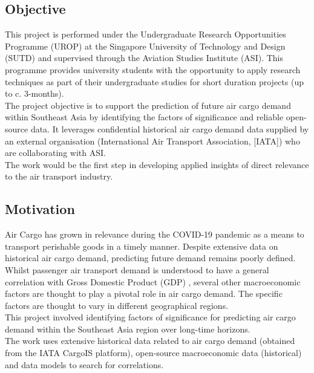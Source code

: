 \documentclass{article}
\begin{document}
\subsection{Objective}

This project is performed under the Undergraduate Research Opportunities Programme (UROP) at the Singapore University of Technology and Design (SUTD) and supervised through the Aviation Studies Institute (ASI). This programme provides university students with the opportunity to apply research techniques as part of their undergraduate studies for short duration projects (up to c. 3-months). \\

\noindent The project objective is to support the prediction of future air cargo demand within Southeast Asia by identifying the factors of significance and reliable open-source data. It leverages confidential historical air cargo demand data supplied by an external organisation (International Air Transport Association, [IATA]) who are collaborating with ASI. \\

\noindent The work would be the first step in developing applied insights of direct relevance to the air transport industry. \\

\subsection{Motivation}

Air Cargo has grown in relevance during the COVID-19 pandemic as a means to transport perishable goods in a timely manner. Despite extensive data on historical air cargo demand, predicting future demand remains poorly defined. Whilst passenger air transport demand is understood to have a general correlation with Gross Domestic Product (GDP) \cite{GDPcorr}, several other macroeconomic factors are thought to play a pivotal role in air cargo demand. The specific factors are thought to vary in different geographical regions. \\

\noindent This project involved identifying factors of significance for predicting air cargo demand within the Southeast Asia region over long-time horizons. \\

\noindent The work uses extensive historical data related to air cargo demand (obtained from the IATA CargoIS platform), open-source macroeconomic data (historical) and data models to search for correlations. \\
\end{document}

